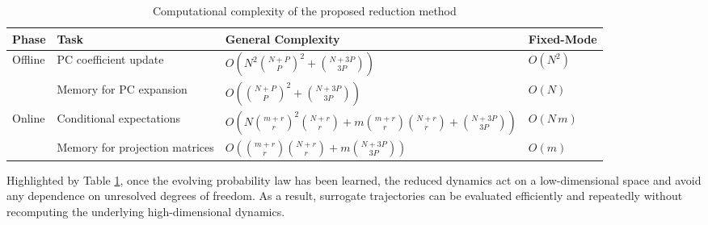 \documentclass[11pt, a4paper, oneside, reqno]{amsart}
\begin{document}
\begin{table}[t]
\centering
\caption{Computational complexity of the proposed reduction method}
\vspace{0.15cm}
\begin{tabular}{llll}
\toprule
\textbf{Phase} & \textbf{Task} & \textbf{General Complexity} & \textbf{Fixed-Mode} \\
\midrule
\multirow{2}{*}{Offline} 
 & PC coefficient update 
 & $O\!\left( N^{2}\binom{N+P}{P}^{2} + \binom{N+3P}{3P} \right)$
 & $O(N^{2})$ \\[2mm]
 & Memory for PC expansion 
 & $O\!\left( \binom{N+P}{P}^{2} + \binom{N+3P}{3P} \right)$
 & $O(N)$ \\[1mm]
\midrule
\multirow{2}{*}{Online}
 & Conditional expectations 
 & $O\!\left( N \binom{m+r}{r}^{2}\binom{N+r}{r} 
   + m \binom{m+r}{r}\binom{N+r}{r} 
   + \binom{N+3P}{3P} \right)$
 & $O(N\,m)$ \\[2mm]
 & Memory for projection matrices 
 & $O\!\left( \binom{m+r}{r}\binom{N+r}{r}
   + m \binom{N+3P}{3P} \right)$
 & $O(m)$ \\
\bottomrule
\end{tabular}
\label{tab:complexity}
\end{table}
Highlighted by Table \ref{tab:complexity}, once the evolving probability law has been learned, the reduced dynamics act on a low-dimensional 
space and avoid any dependence on unresolved degrees of freedom.  
As a result, surrogate trajectories can be evaluated efficiently and repeatedly without recomputing the underlying high-dimensional 
dynamics. 
\end{document}
